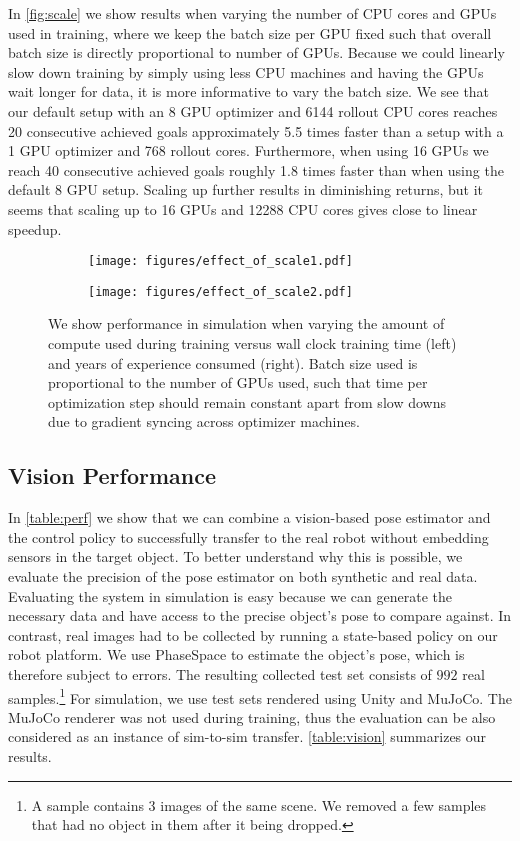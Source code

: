 In \autoref{fig:scale} we show results when varying the number of CPU cores and GPUs used in training, where we keep the batch size per GPU fixed such that overall batch size is directly proportional to number of GPUs.
Because we could linearly slow down training by simply using less CPU machines and having the GPUs wait longer for data, it is more informative to vary the batch size.
We see that our default setup with an 8 GPU optimizer and 6144 rollout CPU cores
reaches 20 consecutive achieved goals approximately 5.5 times faster than a setup with a 1 GPU optimizer and 768 rollout cores. Furthermore, when using 16 GPUs we reach 40 consecutive achieved goals roughly 1.8 times faster than when using the default 8 GPU setup.
Scaling up further results in diminishing returns, but it seems that scaling up to 16 GPUs and 12288 CPU cores gives close to linear speedup.

\begin{figure}[h!]
    \centering
    \begin{subfigure}[t]{0.45\textwidth}
        \centering
        \texttt{[image: figures/effect\_of\_scale1.pdf]}
    \end{subfigure}
    \begin{subfigure}[t]{0.45\textwidth}
        \centering
        \texttt{[image: figures/effect\_of\_scale2.pdf]}
    \end{subfigure}
    \caption{We show performance in simulation when varying the amount of compute used during training versus wall clock training time (left) and years of experience consumed (right). Batch size used is proportional to the number of GPUs used, such that time per optimization step should remain constant apart from slow downs due to gradient syncing across optimizer machines.}
    \label{fig:scale}
\end{figure}




\subsection{Vision Performance}
\label{sec:result-vision}
In \autoref{table:perf} we show that we can combine a vision-based pose estimator and the control policy to successfully transfer to the real robot without embedding sensors in the target object.
To better understand why this is possible, we evaluate the precision of the pose estimator on both synthetic and real data.
Evaluating the system in simulation is easy because we can generate the necessary data and have access to the precise object's pose to compare against.
In contrast, real images had to be collected by running a state-based policy on our robot platform.
We use PhaseSpace to estimate the object's pose, which is therefore subject to errors.
The resulting collected test set consists of $992$ real samples.\footnote{A sample contains 3 images of the same scene. We removed a few samples that had no object in them after it being dropped.}
For simulation, we use test sets rendered using Unity and MuJoCo. The MuJoCo renderer was not used during training, thus the evaluation can be also considered as an instance of sim-to-sim transfer.
\autoref{table:vision} summarizes our results.

